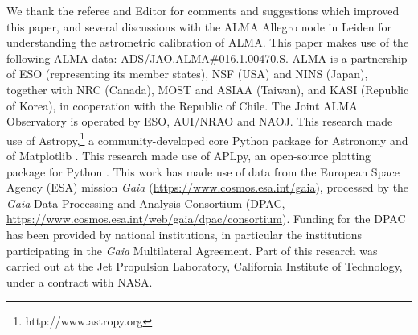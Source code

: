 \documentclass[twocolumn]{aa} %
\begin{document}
\begin{acknowledgements}

  We thank the referee and Editor for comments and suggestions which improved this paper, and several discussions with the ALMA Allegro node in Leiden for understanding the astrometric calibration of ALMA.
This paper makes use of the following ALMA data: ADS/JAO.ALMA\#016.1.00470.S. 
ALMA is a partnership of ESO (representing its member states), NSF (USA) and NINS (Japan), together with NRC (Canada), MOST and ASIAA (Taiwan), and KASI (Republic of Korea), in cooperation with the Republic of Chile.
The Joint ALMA Observatory is operated by ESO, AUI/NRAO and NAOJ.
%
This research made use of Astropy,\footnote{http://www.astropy.org} a community-developed core Python package for Astronomy \citep{astropy:2013, astropy:2018} and of Matplotlib \citep{Hunter:2007}.
This research made use of APLpy, an open-source plotting package for Python \citep{aplpy2012,aplpy2019}.
%
This work has made use of data from the European Space Agency (ESA) mission {\it Gaia} (\url{https://www.cosmos.esa.int/gaia}), processed by the {\it Gaia} Data Processing and Analysis Consortium (DPAC, \url{https://www.cosmos.esa.int/web/gaia/dpac/consortium}). Funding for the DPAC has been provided by national institutions, in particular the institutions participating in the {\it Gaia} Multilateral Agreement.
%
Part of this research was carried out at the Jet Propulsion Laboratory, California Institute of Technology, under a contract with NASA.
%
\end{acknowledgements}



\end{document}
